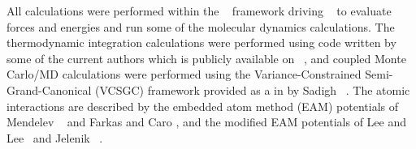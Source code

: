 All calculations were performed within the ~\cite{pyiron, pyiron-paper} framework driving ~\cite{lammps, plimpton1995fast} to evaluate forces and energies and run some of the molecular dynamics calculations.
The thermodynamic integration calculations were performed using code written by some of the current authors which is publicly available on ~\cite{pyiron-contrib}, and coupled Monte Carlo/MD calculations were performed using the Variance-Constrained Semi-Grand-Canonical (VCSGC) framework provided as a  in  by Sadigh \etal~\cite{sadigh2012calculation, sadigh2012scalable}.
The atomic interactions are described by the embedded atom method (EAM) potentials of Mendelev \etal~\cite{mendelev2005effect} and Farkas and Caro \cite{farkas2020model}, and the modified EAM potentials of Lee and Lee~\cite{lee2010modified} and Jelenik \etal~\cite{jelinek2012modified}.